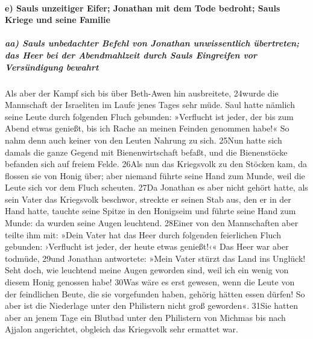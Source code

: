 \hypertarget{e-sauls-unzeitiger-eifer-jonathan-mit-dem-tode-bedroht-sauls-kriege-und-seine-familie}{%
\paragraph{e) Sauls unzeitiger Eifer; Jonathan mit dem Tode bedroht;
Sauls Kriege und seine
Familie}\label{e-sauls-unzeitiger-eifer-jonathan-mit-dem-tode-bedroht-sauls-kriege-und-seine-familie}}

\hypertarget{aa-sauls-unbedachter-befehl-von-jonathan-unwissentlich-uxfcbertreten-das-heer-bei-der-abendmahlzeit-durch-sauls-eingreifen-vor-versuxfcndigung-bewahrt}{%
\subparagraph{aa) Sauls unbedachter Befehl von Jonathan unwissentlich
übertreten; das Heer bei der Abendmahlzeit durch Sauls Eingreifen vor
Versündigung
bewahrt}\label{aa-sauls-unbedachter-befehl-von-jonathan-unwissentlich-uxfcbertreten-das-heer-bei-der-abendmahlzeit-durch-sauls-eingreifen-vor-versuxfcndigung-bewahrt}}

Als aber der Kampf sich bis über Beth-Awen hin ausbreitete, 24wurde die
Mannschaft der Israeliten im Laufe jenes Tages sehr müde. Saul hatte
nämlich seine Leute durch folgenden Fluch gebunden: »Verflucht ist
jeder, der bis zum Abend etwas genießt, bis ich Rache an meinen Feinden
genommen habe!« So nahm denn auch keiner von den Leuten Nahrung zu sich.
25Nun hatte sich damals die ganze Gegend mit Bienenwirtschaft befaßt,
und die Bienenstöcke befanden sich auf freiem Felde. 26Als nun das
Kriegsvolk zu den Stöcken kam, da flossen sie von Honig über; aber
niemand führte seine Hand zum Munde, weil die Leute sich vor dem Fluch
scheuten. 27Da Jonathan es aber nicht gehört hatte, als sein Vater das
Kriegsvolk beschwor, streckte er seinen Stab aus, den er in der Hand
hatte, tauchte seine Spitze in den Honigseim und führte seine Hand zum
Munde: da wurden seine Augen leuchtend. 28Einer von den Mannschaften
aber teilte ihm mit: »Dein Vater hat das Heer durch folgenden
feierlichen Fluch gebunden: ›Verflucht ist jeder, der heute etwas
genießt!‹« Das Heer war aber todmüde, 29und Jonathan antwortete: »Mein
Vater stürzt das Land ins Unglück! Seht doch, wie leuchtend meine Augen
geworden sind, weil ich ein wenig von diesem Honig genossen habe! 30Was
wäre es erst gewesen, wenn die Leute von der feindlichen Beute, die sie
vorgefunden haben, gehörig hätten essen dürfen! So aber ist die
Niederlage unter den Philistern nicht groß geworden«. 31Sie hatten aber
an jenem Tage ein Blutbad unter den Philistern von Michmas bis nach
Ajjalon angerichtet, obgleich das Kriegsvolk sehr ermattet war.

